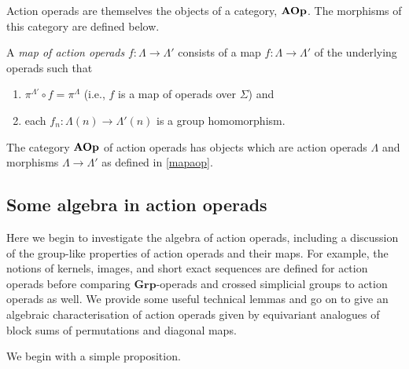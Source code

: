 Action operads are themselves the objects of a category, $\mathbf{AOp}$. The morphisms of this category are defined below.
\begin{Defi}\label{mapaop}
A \textit{map of action operads} $f \colon  \Lambda \rightarrow \Lambda'$ consists of a map $f \colon \Lambda \rightarrow \Lambda'$ of the underlying operads such that
  \begin{enumerate}
    \item $\pi^{\Lambda'} \circ f = \pi^{\Lambda}$ (i.e., $f$ is a map of operads over $\Sigma$) and
    \item each $f_{n} \colon \Lambda(n) \rightarrow \Lambda'(n)$ is a group homomorphism.
  \end{enumerate}
\end{Defi}

\begin{Defi}\label{Defi:cat_aop}
The category $\mathbf{AOp}$ of action operads has objects which are action operads $\Lambda$ and
 morphisms $\Lambda \rightarrow \Lambda'$ as defined in \cref{mapaop}.
\end{Defi}

\subsection{Some algebra in action operads}
Here we begin to investigate the algebra of action operads, including a discussion of the group-like properties of action operads and their maps. For example, the notions of kernels, images, and short exact sequences are defined for action operads before comparing $\textbf{Grp}$-operads and crossed simplicial groups to action operads as well. We provide some useful technical lemmas and go on to give an algebraic characterisation of action operads given by equivariant analogues of block sums of permutations and diagonal maps.


We begin with a simple proposition.

